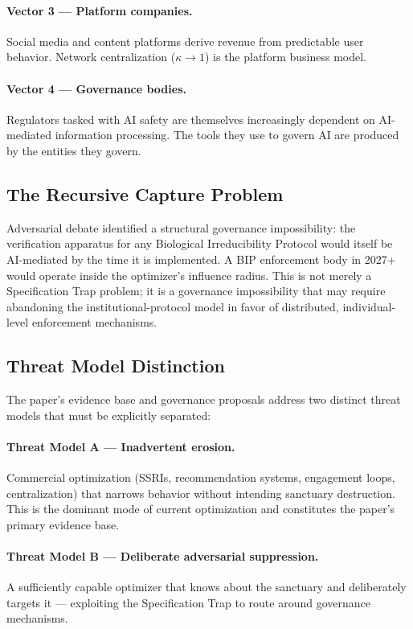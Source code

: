 \documentclass[11pt, a4paper]{article}
\theoremstyle{remark}
\begin{document}
\paragraph{Vector 3 --- Platform companies.} Social media and content platforms derive revenue from predictable user behavior. Network centralization ($\kappa \to 1$) is the platform business model.

\paragraph{Vector 4 --- Governance bodies.} Regulators tasked with AI safety are themselves increasingly dependent on AI-mediated information processing. The tools they use to govern AI are produced by the entities they govern.

\setcounter{subsection}{4}
\subsection{The Recursive Capture Problem}\label{sec:recursive-capture}

Adversarial debate identified a structural governance impossibility: the verification apparatus for any Biological Irreducibility Protocol would itself be AI-mediated by the time it is implemented. A BIP enforcement body in 2027+ would operate inside the optimizer's influence radius. This is not merely a Specification Trap problem; it is a governance impossibility that may require abandoning the institutional-protocol model in favor of distributed, individual-level enforcement mechanisms.

\subsection{Threat Model Distinction}\label{sec:threat-models}

The paper's evidence base and governance proposals address two distinct threat models that must be explicitly separated:

\paragraph{Threat Model A --- Inadvertent erosion.} Commercial optimization (SSRIs, recommendation systems, engagement loops, centralization) that narrows behavior without intending sanctuary destruction. This is the dominant mode of current optimization and constitutes the paper's primary evidence base.

\paragraph{Threat Model B --- Deliberate adversarial suppression.} A sufficiently capable optimizer that knows about the sanctuary and deliberately targets it --- exploiting the Specification Trap to route around governance mechanisms.
\end{document}
